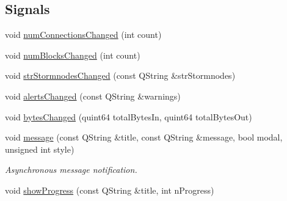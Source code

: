 \subsection*{Signals}
\begin{DoxyCompactItemize}
\item 
void \hyperlink{class_client_model_a8eea0203366271384b0bf62f1f39a56c}{num\+Connections\+Changed} (int count)
\item 
void \hyperlink{class_client_model_a649c53bba0c617d026cdcd22c243fa26}{num\+Blocks\+Changed} (int count)
\item 
void \hyperlink{class_client_model_a02aa81bb6710add3a3e4ec2ac88616c6}{str\+Stormnodes\+Changed} (const Q\+String \&str\+Stormnodes)
\item 
void \hyperlink{class_client_model_ae40a55475e8a39d928ce861e67f5497f}{alerts\+Changed} (const Q\+String \&warnings)
\item 
void \hyperlink{class_client_model_a06dd7e0e518b70e73684ca679bdf93b5}{bytes\+Changed} (quint64 total\+Bytes\+In, quint64 total\+Bytes\+Out)
\item 
void \hyperlink{class_client_model_a67d8c0971df370d8098960df3d51a645}{message} (const Q\+String \&title, const Q\+String \&message, bool modal, unsigned int style)
\begin{DoxyCompactList}\small\item\em Asynchronous message notification. \end{DoxyCompactList}\item 
void \hyperlink{class_client_model_a0b0ff10589ec0fd323251be7aa0fa6a2}{show\+Progress} (const Q\+String \&title, int n\+Progress)
\end{DoxyCompactItemize}
